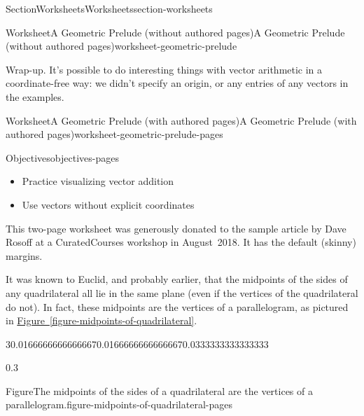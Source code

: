 \documentclass[oneside,10pt,]{article}
\newcommand{\xreffont}{\relax}
\newcommand{\ptxlistdisc}{\raisebox{0.3ex}{\textbullet}}
\numberwithin{equation}{section}
\begin{document}
\begin{sectionptx}{Section}{Worksheets}{}{Worksheets}{}{}{section-worksheets}
\begin{worksheet-subsection}{Worksheet}{A Geometric Prelude (without authored pages)}{}{A Geometric Prelude (without authored pages)}{}{}{worksheet-geometric-prelude}
\begin{conclusion}{Wrap-up.}%
It's possible to do interesting things with vector arithmetic in a coordinate-free way: we didn't specify an origin, or any entries of any vectors in the examples.%
\end{conclusion}%
\end{worksheet-subsection}
\restoregeometry
%
%
\typeout{************************************************}
\typeout{************************************************}
%
\begin{worksheet-subsection}{Worksheet}{A Geometric Prelude (with authored pages)}{}{A Geometric Prelude (with authored pages)}{}{}{worksheet-geometric-prelude-pages}
\begin{objectives}{Objectives}{objectives-pages}
%
\begin{itemize}[label=\ptxlistdisc]
\item{}Practice visualizing vector addition%
\item{}Use vectors without explicit coordinates%
\end{itemize}
\end{objectives}
\begin{introduction}{}%
This two-page worksheet was generously donated to the sample article by Dave Rosoff at a CuratedCourses workshop in August~2018.  It has the default (skinny) margins.%
\par
It was known to Euclid, and probably earlier, that the midpoints of the sides of any quadrilateral all lie in the same plane (even if the vertices of the quadrilateral do not). In fact, these midpoints are the vertices of a parallelogram, as pictured in \hyperref[figure-midpoints-of-quadrilateral]{Figure~{\xreffont\ref{figure-midpoints-of-quadrilateral}}}.%
\begin{sidebyside}{3}{0.0166666666666667}{0.0166666666666667}{0.0333333333333333}%
\begin{sbspanel}{0.3}%
\begin{panelfigureptx}{Figure}{The midpoints of the sides of a quadrilateral are the vertices of a parallelogram.}{figure-midpoints-of-quadrilateral-pages}{}%
\noindent{}
\end{panelfigureptx}
\end{sbspanel}
\end{sidebyside}
\end{introduction}
\end{worksheet-subsection}
\end{sectionptx}
\end{document}

